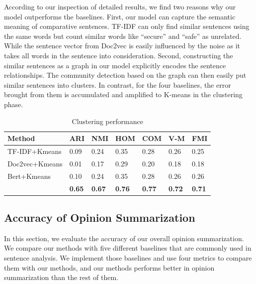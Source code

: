 According to our inspection of detailed results, we find two reasons why our model outperforms the baselines.
First, our model can capture the semantic meaning of comparative sentences.
TF-IDF can only find similar sentences using the same words but count similar words like ``secure'' and ``safe'' as unrelated.
While the sentence vector from Doc2vec is easily influenced by the noise as it takes all words in the sentence into consideration. 
Second, constructing the similar sentences as a graph in our model explicitly encodes the sentence relationships.
The community detection based on the graph can then easily put similar sentences into clusters.
In contrast, for the four baselines, the error brought from them is accumulated and amplified to K-means in the clustering phase.

\begin{table}
	\centering
	\caption{Clustering performance}
	\vspace{-2mm}
	\setlength{\tabcolsep}{0.5em}
	\begin{tabular}{lllllll}
	\hline
	\textbf{Method} & \textbf{ARI} & \textbf{NMI} & \textbf{HOM} & \textbf{COM} & \textbf{V-M} & \textbf{FMI} \\ \hline
	TF-IDF+Kmeans  & 0.09&0.24&0.35&0.28&0.26&0.25\\
	Doc2vec+Kmeans & 0.01&0.17&0.29&0.20&0.18&0.18\\
	Bert+Kmeans & 0.10&0.24&0.35&0.28&0.26&0.26\\
	\tool & \textbf{0.65}&\textbf{0.67}&\textbf{0.76}&\textbf{0.77}&\textbf{0.72}&\textbf{0.71}\\
	\hline
	\end{tabular}
	\vspace{-1mm}
	\label{tab:clusterEvaluation}
\end{table}

\subsection{Accuracy of Opinion Summarization}
\label{sec:summarization}
In this section, we evaluate the accuracy of our overall opinion summarization. We compare our methods with five different baselines that are commonly used in sentence analysis. We implement those baselines and use four metrics to compare them with our methods, and our methods performs better in opinion summarization than the rest of them.


